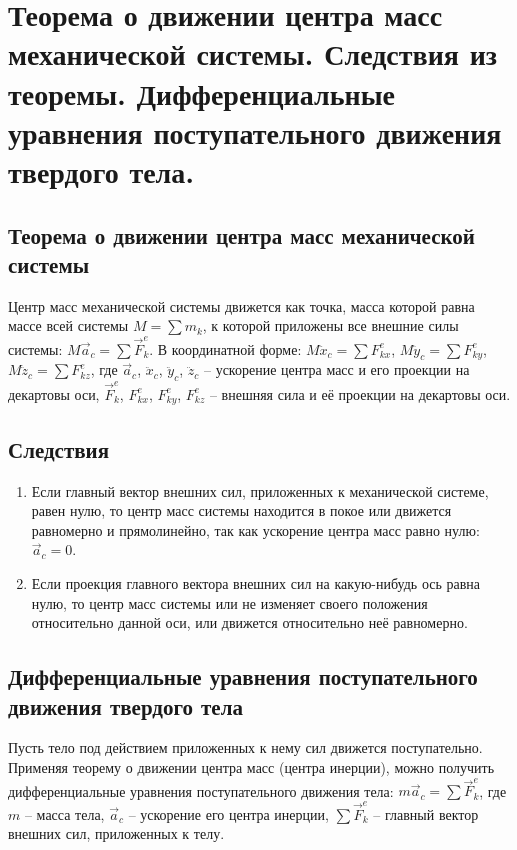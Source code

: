 \chapter{Теорема о движении центра масс механической системы. Следствия из
теоремы. Дифференциальные уравнения поступательного движения твердого
тела.}

\section{Теорема о движении центра масс механической системы}
Центр масс механической системы движется как точка, масса которой равна массе
всей системы \( M = \sum m_k \), к которой приложены все внешние силы системы:
\( M\vec{a}_c = \sum \vec{F}^e_k \). В координатной форме:
\( M\ddot{x}_c = \sum F^e_{kx} \), \( M\ddot{y}_c = \sum F^e_{ky} \),
\( M\ddot{z}_c = \sum F^e_{kz} \), где \( \vec{a}_c \), \( \ddot{x}_c \),
\( \ddot{y}_c \), \( \ddot{z}_c \) -- ускорение центра масс и его проекции на
декартовы оси, \( \vec{F}^e_k \), \( F^e_{kx} \), \( F^e_{ky} \), \( F^e_{kz} \)
-- внешняя сила и её проекции на декартовы оси.

\section{Следствия}
\begin{enumerate}
    \item Если главный вектор внешних сил, приложенных к механической системе,
    равен нулю, то центр масс системы находится в покое или движется равномерно
    и прямолинейно, так как ускорение центра масс равно нулю:
    \( \vec{a}_c = 0 \).
    
    \item Если проекция главного вектора внешних сил на какую-нибудь ось равна
    нулю, то центр масс системы или не изменяет своего положения относительно
    данной оси, или движется относительно неё равномерно.
\end{enumerate}

\section{Дифференциальные уравнения поступательного движения твердого тела}

Пусть тело под действием приложенных к нему сил движется поступательно. Применяя
теорему о движении центра масс (центра инерции), можно получить дифференциальные
уравнения поступательного движения тела: \( m\vec{a}_c = \sum \vec{F}^e_k \), где
\( m \) -- масса тела, \( \vec{a}_c \) -- ускорение его центра инерции,
\( \sum \vec{F}^e_k \) -- главный вектор внешних сил, приложенных к телу.

